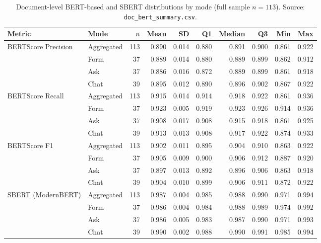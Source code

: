 \begin{table}
\centering
\small
\begin{tabular}{@{}l l r r r r r r r r@{}}
\toprule
Metric & Mode & $n$ & Mean & SD & Q1 & Median & Q3 & Min & Max \\
\midrule
\multirow{4}{*}{BERTScore Precision} & Aggregated  & 113 & 0.890 & 0.014 & 0.880 & 0.891 & 0.900 & 0.861 & 0.922 \\
                                     & Form & 37  & 0.889 & 0.014 & 0.880 & 0.889 & 0.899 & 0.862 & 0.912 \\
                                     & Ask  & 37  & 0.886 & 0.016 & 0.872 & 0.889 & 0.899 & 0.861 & 0.918 \\
                                     & Chat & 39  & 0.895 & 0.012 & 0.890 & 0.896 & 0.902 & 0.867 & 0.922 \\
\midrule
\multirow{4}{*}{BERTScore Recall}    & Aggregated  & 113 & 0.915 & 0.014 & 0.914 & 0.918 & 0.922 & 0.861 & 0.936 \\
                                     & Form & 37  & 0.923 & 0.005 & 0.919 & 0.923 & 0.926 & 0.914 & 0.936 \\
                                     & Ask  & 37  & 0.908 & 0.017 & 0.908 & 0.915 & 0.918 & 0.861 & 0.925 \\
                                     & Chat & 39  & 0.913 & 0.013 & 0.908 & 0.917 & 0.922 & 0.874 & 0.933 \\
\midrule
\multirow{4}{*}{BERTScore F1}        & Aggregated  & 113 & 0.902 & 0.011 & 0.895 & 0.904 & 0.910 & 0.863 & 0.922 \\
                                     & Form & 37  & 0.905 & 0.009 & 0.900 & 0.906 & 0.912 & 0.887 & 0.920 \\
                                     & Ask  & 37  & 0.897 & 0.013 & 0.892 & 0.896 & 0.906 & 0.863 & 0.918 \\
                                     & Chat & 39  & 0.904 & 0.010 & 0.899 & 0.906 & 0.911 & 0.872 & 0.922 \\
\midrule
\multirow{4}{*}{SBERT (ModernBERT)}  & Aggregated  & 113 & 0.987 & 0.004 & 0.985 & 0.988 & 0.990 & 0.971 & 0.994 \\
                                     & Form & 37  & 0.986 & 0.004 & 0.984 & 0.988 & 0.989 & 0.974 & 0.992 \\
                                     & Ask  & 37  & 0.986 & 0.005 & 0.983 & 0.987 & 0.990 & 0.971 & 0.993 \\
                                     & Chat & 39  & 0.990 & 0.002 & 0.988 & 0.990 & 0.991 & 0.985 & 0.994 \\
\bottomrule
\end{tabular}
\caption{Document-level BERT-based and SBERT distributions by mode
(full sample $n = 113$). Source: \texttt{doc\_bert\_summary.csv}.}
\label{tab:nlp-doc-distrib-bert}
\end{table}
\FloatBarrier

